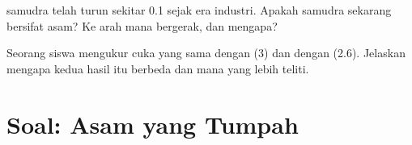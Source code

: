 \begin{exercise}[$\star\star\star$]\label{exo:g9:acids-bases-ph:11}
 samudra telah turun sekitar 0.1 sejak era industri. Apakah samudra
sekarang bersifat asam? Ke arah mana  bergerak, dan mengapa?
\end{exercise}

\begin{exercise}[$\star\star\star$]\label{exo:g9:acids-bases-ph:12}
Seorang siswa mengukur  cuka yang sama dengan  (3) dan dengan
 (2.6). Jelaskan mengapa kedua hasil itu berbeda dan mana yang
lebih teliti.
\end{exercise}

\section{Soal: Asam yang Tumpah}

